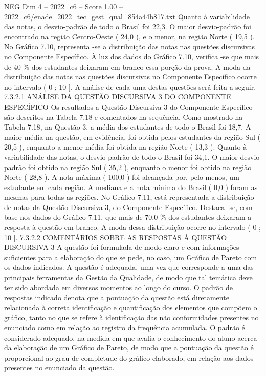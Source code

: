 \begin{textsample}{NEG Dim 4 – 2022\_c6 – Score 1.00 – 2022\_c6/enade\_2022\_tec\_gest\_qual\_854a44b817.txt}
Quanto à variabilidade das notas, o desvio-padrão de todo o Brasil foi 22,3.
O maior desvio-padrão foi encontrado na região Centro-Oeste ( 24,0 ), e o menor, na região Norte ( 19,5 ).
No Gráfico 7.10, representa -se a distribuição das notas nas questões discursivas no Componente Específico.
À luz dos dados do Gráfico 7.10, verifica -se que mais de 40 \% dos estudantes deixaram em branco essa porção da prova.
A moda da distribuição das notas nas questões discursivas no Componente Específico ocorre no intervalo ( 0 ; 10 ].
A análise de cada uma destas questões será feita a seguir. 7.3.2.1 ANÁLISE DA QUESTÃO DISCURSIVA 3 DO COMPONENTE ESPECÍFICO Os resultados a Questão Discursiva 3 do Componente Específico são descritos na Tabela 7.18 e comentados na sequência.
Como mostrado na Tabela 7.18, na Questão 3, a média dos estudantes de todo o Brasil foi 18,7.
A maior média na questão, em evidência, foi obtida pelos estudantes da região Sul ( 20,5 ), enquanto a menor média foi obtida na região Norte ( 13,3 ).
Quanto à variabilidade das notas, o desvio-padrão de todo o Brasil foi 34,1.
O maior desvio-padrão foi obtido na região Sul ( 35,2 ), enquanto o menor foi obtido na região Norte ( 28,8 ).
A nota máxima ( 100,0 ) foi alcançada por, pelo menos, um estudante em cada região.
A mediana e a nota mínima do Brasil ( 0,0 ) foram as mesmas para todas as regiões.
No Gráfico 7.11, está representada a distribuição de notas da Questão Discursiva 3, do Componente Específico.
Destaca -se, com base nos dados do Gráfico 7.11, que mais de 70,0 \% dos estudantes deixaram a resposta à questão em branco.
A moda dessa distribuição ocorre no intervalo ( 0 ; 10 ]. 7.3.2.2 COMENTÁRIOS SOBRE AS RESPOSTAS À QUESTÃO DISCURSIVA 3 A questão foi formulada de modo claro e com informações suficientes para a elaboração do que se pede, no caso, um Gráfico de Pareto com os dados indicados.
A questão é adequada, uma vez que corresponde a uma das principais ferramentas da Gestão da Qualidade, de modo que tal temática deve ter sido abordada em diversos momentos ao longo do curso.
O padrão de respostas indicado denota que a pontuação da questão está diretamente relacionada à correta identificação e quantificação dos elementos que compõem o gráfico, tanto no que se refere à identificação das não conformidades presentes no enunciado como em relação ao registro da frequência acumulada.
O padrão é considerado adequado, na medida em que avalia o conhecimento do aluno acerca da elaboração de um Gráfico de Pareto, de modo que a pontuação da questão é proporcional ao grau de completude do gráfico elaborado, em relação aos dados presentes no enunciado da questão.

\end{textsample}
